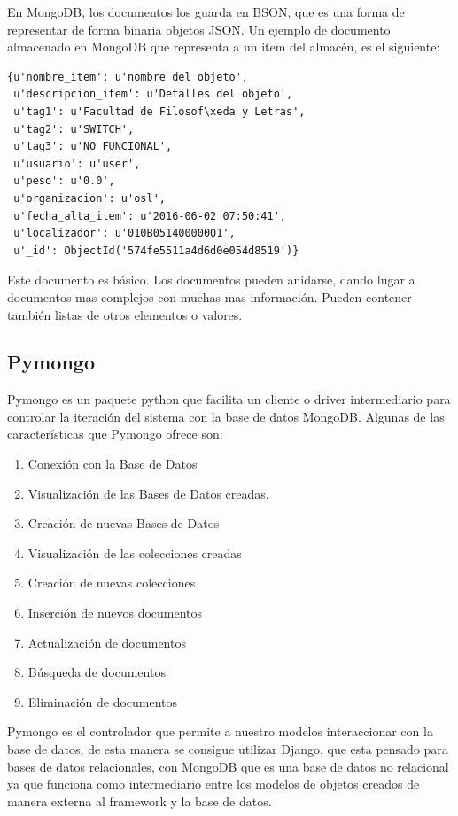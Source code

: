 \documentclass[a4paper,11pt]{book}
\begin{document}
En MongoDB, los documentos los guarda en BSON, que es una forma de representar de forma binaria objetos JSON. Un ejemplo de documento almacenado en MongoDB que representa a un item del almacén, es el siguiente:

\begin{lstlisting}
{u'nombre_item': u'nombre del objeto', 
 u'descripcion_item': u'Detalles del objeto', 
 u'tag1': u'Facultad de Filosof\xeda y Letras',
 u'tag2': u'SWITCH',
 u'tag3': u'NO FUNCIONAL',
 u'usuario': u'user',
 u'peso': u'0.0',
 u'organizacion': u'osl',
 u'fecha_alta_item': u'2016-06-02 07:50:41',
 u'localizador': u'010B05140000001',
 u'_id': ObjectId('574fe5511a4d6d0e054d8519')}

\end{lstlisting}

Este documento es básico. Los documentos pueden anidarse, dando lugar a documentos mas complejos con muchas mas información. Pueden contener también listas de otros elementos o valores. 

\subsection{Pymongo} 
Pymongo\cite{pymongo} es un paquete python que facilita un cliente o driver intermediario para controlar la iteración del sistema con la base de datos MongoDB. Algunas de las características que Pymongo ofrece son:

\begin{enumerate}
\item Conexión con la Base de Datos
\item Visualización de las Bases de Datos creadas.
\item Creación de nuevas Bases de Datos
\item Visualización de las colecciones creadas
\item Creación de nuevas colecciones
\item Inserción de nuevos documentos
\item Actualización de documentos
\item Búsqueda de documentos
\item Eliminación de documentos
\end{enumerate}

Pymongo es el controlador que permite a nuestro modelos interaccionar con la base de datos, de esta manera se consigue utilizar Django, que esta pensado para bases de datos relacionales, con MongoDB que es una base de datos no relacional ya que funciona como intermediario entre los modelos de objetos creados de manera externa al framework y la base de datos.
\end{document}
